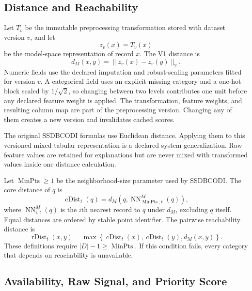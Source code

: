 \documentclass[11pt]{article}
\newcommand{\rDist}{\operatorname{rDist}}
\newcommand{\cDist}{\operatorname{cDist}}
\newcommand{\MinPts}{\operatorname{MinPts}}
\begin{document}
\subsection{Distance and Reachability}

Let $T_v$ be the immutable preprocessing transformation stored with dataset
version $v$, and let
\begin{equation}
    z_v(x)=T_v(x)
\end{equation}
be the model-space representation of record $x$. The V1 distance is
\begin{equation}
    d_M(x,y)=\|z_v(x)-z_v(y)\|_2.
\end{equation}
Numeric fields use the declared imputation and robust-scaling parameters fitted
for version $v$. A categorical field uses an explicit missing category and a
one-hot block scaled by $1/\sqrt{2}$, so changing between two levels contributes
one unit before any declared feature weight is applied. The transformation,
feature weights, and resulting column map are part of the preprocessing version.
Changing any of them creates a new version and invalidates cached scores.

The original SSDBCODI formulas use Euclidean distance. Applying them to this
versioned mixed-tabular representation is a declared system generalization.
Raw feature values are retained for explanations but are never mixed with
transformed values inside one distance calculation.

Let $\MinPts\geq 1$ be the neighborhood-size parameter used by SSDBCODI. The
core distance of $q$ is
\begin{equation}
    \cDist_t(q)
    =
    d_M\!\left(q,\operatorname{NN}^{M}_{\MinPts,t}(q)\right),
\end{equation}
where $\operatorname{NN}^{M}_{i,t}(q)$ is the $i$th nearest record to $q$ under
$d_M$, excluding $q$ itself. Equal distances are ordered by stable point
identifier. The pairwise reachability distance is
\begin{equation}
    \rDist_t(x,y)
    =
    \max\!\left\{
        \cDist_t(x),
        \cDist_t(y),
        d_M(x,y)
    \right\}.
\end{equation}
These definitions require $|D|-1\geq\MinPts$. If this condition fails, every
category that depends on reachability is unavailable.

\subsection{Availability, Raw Signal, and Priority Score}
\end{document}
